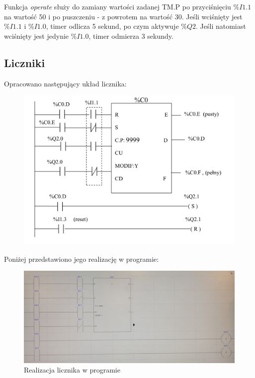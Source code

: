 \documentclass[12pt]{article}
\begin{document}
Funkcja \textit{operate} służy do zamiany wartości zadanej TM.P po przyciśnięciu $\%I1.1$ na wartość 50 i po puszczeniu - z powrotem na wartość 30. Jeśli wciśnięty jest $\%I1.1$ i $\%I1.0$, timer odlicza 5 sekund, po czym aktywuje $\%Q2$. Jeśli natomiast wciśnięty jest jedynie $\%I1.0$, timer odmierza 3 sekundy.


\subsection{Liczniki}

Opracowano następujący układ licznika:
\begin{figure}[H]
    \centering
    \includegraphics[scale=0.35]{licznik.png}
    \caption{}
\end{figure}

Poniżej przedstawiono jego realizację w programie:
\begin{figure}[H]
    \centering
    \includegraphics[width=\textwidth]{licznik_zdj.jpg}
    \caption{Realizacja licznika w programie}
\end{figure}
\end{document}
